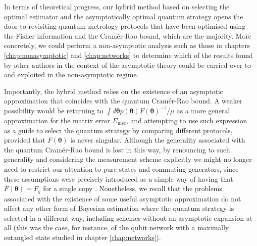 In terms of theoretical progress, our hybrid method based on selecting the optimal estimator and the asymptotically optimal quantum strategy opens the door to revisiting quantum metrology protocols that have been optimised using the Fisher information and the Cram\'{e}r-Rao bound, which are the majority. More concretely, we could perform a non-asymptotic analysis such as those in chapters \ref{chap:nonasymptotic} and \ref{chap:networks} to determine which of the results found by other authors in the context of the asymptotic theory could be carried over to and exploited in the non-asymptotic regime. 

Importantly, the hybrid method relies on the existence of an asymptotic approximation that coincides with the quantum Cram\'{e}r-Rao bound. A weaker possibility would be returning to $\int d\boldsymbol{\theta}p(\boldsymbol{\theta})F(\boldsymbol{\theta})^{-1}/\mu$ as a more general approximation for the matrix error $\Sigma_{\mathrm{mse}}$, and attempting to use such expression as a guide to select the quantum strategy by comparing different protocols, provided that $F(\boldsymbol{\theta})$ is never singular. Although the generality associated with the quantum Cram\'{e}r-Rao bound is lost in this way, by renouncing to such generality and considering the measurement scheme explicitly we might no longer need to restrict our attention to pure states and commuting generators, since these assumptions were precisely introduced as a simple way of having that $F(\boldsymbol{\theta}) = F_q$ for a single copy \cite{sammy2016compatibility}. Nonetheless, we recall that the problems associated with the existence of some useful asymptotic approximation do not affect any other form of Bayesian estimation where the quantum strategy is selected in a different way, including schemes without an asymptotic expansion at all (this was the case, for instance, of the qubit network with a maximally entangled state studied in chapter \ref{chap:networks}).


